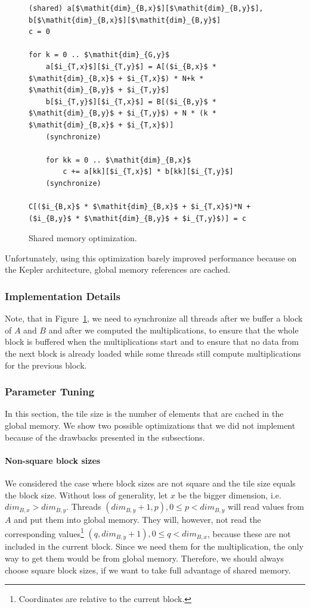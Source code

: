 \documentclass[12pt]{article}
\begin{document}
\begin{figure}[H]
\begin{lstlisting}[mathescape]
(shared) a[$\mathit{dim}_{B,x}$][$\mathit{dim}_{B,y}$], b[$\mathit{dim}_{B,x}$][$\mathit{dim}_{B,y}$]
c = 0

for k = 0 .. $\mathit{dim}_{G,y}$
	a[$i_{T,x}$][$i_{T,y}$] = A[($i_{B,x}$ * $\mathit{dim}_{B,x}$ + $i_{T,x}$) * N+k * $\mathit{dim}_{B,y}$ + $i_{T,y}$]
	b[$i_{T,y}$][$i_{T,x}$] = B[($i_{B,y}$ * $\mathit{dim}_{B,y}$ + $i_{T,y}$) + N * (k * $\mathit{dim}_{B,x}$ + $i_{T,x}$)]
    (synchronize)
    
	for kk = 0 .. $\mathit{dim}_{B,x}$
		c += a[kk][$i_{T,x}$] * b[kk][$i_{T,y}$]
    (synchronize)
    
C[($i_{B,x}$ * $\mathit{dim}_{B,x}$ + $i_{T,x}$)*N + ($i_{B,y}$ * $\mathit{dim}_{B,y}$ + $i_{T,y}$)] = c
\end{lstlisting}
\caption{Shared memory optimization.}
\label{fig:shared_mem}
\end{figure}

\noindent Unfortunately, using this optimization barely improved performance because on the Kepler architecture, global memory references are cached.

\subsubsection{Implementation Details}
Note, that in Figure~\ref{fig:shared_mem}, we need to synchronize all threads after we buffer a block of $A$ and $B$ and after we computed the multiplications, to ensure that the whole block is buffered when the multiplications start and to ensure that no data from the next block is already loaded while some threads still compute multiplications for the previous block.

\subsubsection{Parameter Tuning}
In this section, the tile size is the number of elements that are cached in the global memory. We show two possible optimizations that we did not implement because of the drawbacks presented in the subsections.

\paragraph{Non-square block sizes}
We considered the case where block sizes are not square and the tile size equals the block size. Without loss of generality, let $x$ be the bigger dimension, i.e. $\mathit{dim}_{B,x} > \mathit{dim}_{B,y}$. Threads $(\mathit{dim}_{B,y} + 1, p), 0 \leq p < \mathit{dim}_{B,y}$ will read values from $A$ and put them into global memory. They will, however, not read the corresponding values\footnote{Coordinates are relative to the current block.} $(q, \mathit{dim}_{B,y} + 1), 0 \leq q < \mathit{dim}_{B,x}$, because these are not included in the current block. Since we need them for the multiplication, the only way to get them would be from global memory. Therefore, we should always choose square block sizes, if we want to take full advantage of shared memory.
\end{document}
